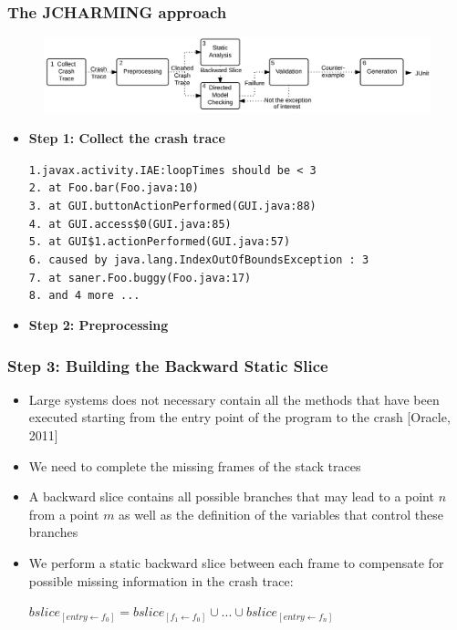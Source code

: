 \documentclass{beamer}
\begin{document}
\begin{frame}
\frametitle{The JCHARMING approach}

\begin{figure}
\includegraphics[width=0.97\linewidth]{media/approach.png}
\end{figure}

\begin{itemize}
\item \textbf{Step 1: Collect the crash trace}

\begin{small}
\texttt{1.javax.activity.IAE:loopTimes
should be < 3\\
2. at Foo.bar(Foo.java:10)\\
3. at GUI.buttonActionPerformed(GUI.java:88)\\
4. at GUI.access\$0(GUI.java:85)\\
5. at GUI\$1.actionPerformed(GUI.java:57)\\
6. caused by java.lang.IndexOutOfBoundsException : 3\\
7. at saner.Foo.buggy(Foo.java:17)\\
8. and 4 more ...\\}
\end{small}

\item \textbf{Step 2: Preprocessing}

\end{itemize}

\end{frame}

\begin{frame}
\frametitle{Step 3: Building the Backward Static Slice}

\begin{itemize}
\item Large systems does not necessary contain all
the methods that have been executed starting from the entry
point of the program to the crash [Oracle, 2011]
\item We need to complete the missing frames of the stack traces
\item A backward slice contains all possible branches that may lead to a point $n$ from a point $m$ as well as the definition of the variables that control these branches
\item We perform a static backward slice between each frame to
compensate for possible missing information in the crash
trace:

\begin{center}
$ bslice_{[entry \leftarrow f_0]} = bslice_{[f_1 \leftarrow f_0]} \cup ... \cup bslice_{[entry \leftarrow f_n]}$
\end{center}

\end{itemize}

\end{frame}
\end{document}
